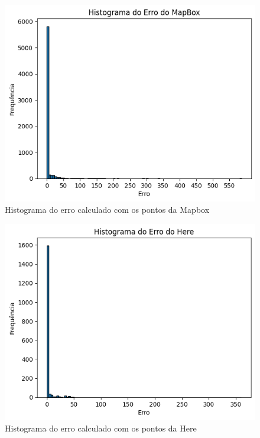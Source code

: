 \documentclass{article}
\begin{document}
\begin{figure}[h]
  \centering
  \includegraphics[width=\textwidth]{hist1.png}
  \caption{Histograma do erro calculado com os pontos da Mapbox}
  \label{fig:hist1}
\end{figure}

\begin{figure}[h]
  \centering
  \includegraphics[width=\textwidth]{hist2.png}
  \caption{Histograma do erro calculado com os pontos da Here}
  \label{fig:hist2}
\end{figure}
\end{document}
